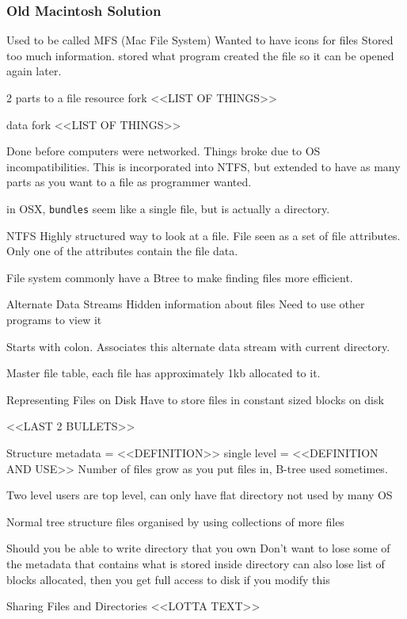 \documentclass{article}
\begin{document}
		\subsubsection*{Old Macintosh Solution}
			Used to be called MFS (Mac File System)
			Wanted to have icons for files
			Stored too much information. stored what program created the file so it can be opened again later.

			2 parts to a file
				resource fork
					<<LIST OF THINGS>>

				data fork
					<<LIST OF THINGS>>

			Done before computers were networked. Things broke due to OS incompatibilities.
			This is incorporated into NTFS, but extended to have as many parts as you want to a file as programmer wanted.

			in OSX, \texttt{bundles} seem like a single file, but is actually a directory.	

		NTFS
			Highly structured way to look at a file.
			File seen as a set of file attributes.
			Only one of the attributes contain the file data.

			File system commonly have a Btree to make finding files more efficient.

		Alternate Data Streams
			Hidden information about files
			Need to use other programs to view it

			Starts with colon. Associates this alternate data stream with current directory.

			Master file table, each file has approximately 1kb allocated to it.

		Representing Files on Disk
			Have to store files in constant sized blocks on disk

			<<LAST 2 BULLETS>>

		Structure
			metadata = <<DEFINITION>>
			single level = <<DEFINITION AND USE>>
				Number of files grow as you put files in, B-tree used sometimes.

			Two level
				users are top level, can only have flat directory
				not used by many OS

			Normal
				tree structure
				files organised by using collections of more files

				Should you be able to write directory that you own
					Don't want to lose some of the metadata that contains what is stored inside directory
					can also lose list of blocks allocated, then you get full access to disk if you modify this

		Sharing Files and Directories
			<<LOTTA TEXT>>
\end{document}
